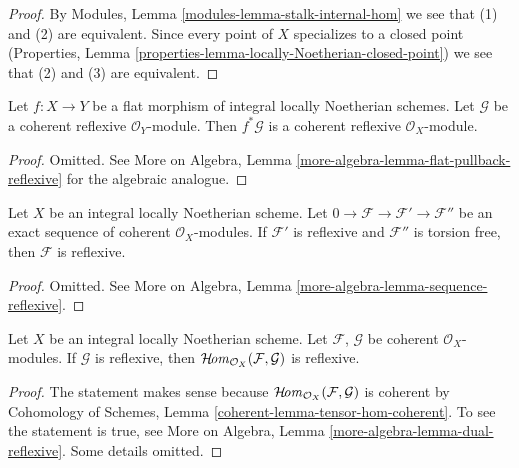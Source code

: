 \begin{proof}
By Modules, Lemma \ref{modules-lemma-stalk-internal-hom} we see that
(1) and (2) are equivalent. Since every point of $X$ specializes to
a closed point
(Properties, Lemma \ref{properties-lemma-locally-Noetherian-closed-point})
we see that (2) and (3) are equivalent.
\end{proof}

\begin{lemma}
\label{lemma-flat-pullback-reflexive}
Let $f : X \to Y$ be a flat morphism of integral locally Noetherian schemes.
Let $\mathcal{G}$ be a coherent reflexive $\mathcal{O}_Y$-module.
Then $f^*\mathcal{G}$ is a coherent reflexive $\mathcal{O}_X$-module.
\end{lemma}

\begin{proof}
Omitted. See
More on Algebra, Lemma \ref{more-algebra-lemma-flat-pullback-reflexive}
for the algebraic analogue.
\end{proof}

\begin{lemma}
\label{lemma-sequence-reflexive}
Let $X$ be an integral locally Noetherian scheme.
Let $0 \to \mathcal{F} \to \mathcal{F}' \to \mathcal{F}''$ be
an exact sequence of coherent $\mathcal{O}_X$-modules.
If $\mathcal{F}'$ is reflexive and $\mathcal{F}''$ is torsion free,
then $\mathcal{F}$ is reflexive.
\end{lemma}

\begin{proof}
Omitted. See More on Algebra, Lemma \ref{more-algebra-lemma-sequence-reflexive}.
\end{proof}

\begin{lemma}
\label{lemma-dual-reflexive}
Let $X$ be an integral locally Noetherian scheme.
Let $\mathcal{F}$, $\mathcal{G}$ be
coherent $\mathcal{O}_X$-modules.
If $\mathcal{G}$ is reflexive,
then $\mathop{\mathcal{H}\!\mathit{om}}\nolimits_{\mathcal{O}_X}(\mathcal{F}, \mathcal{G})$ is reflexive.
\end{lemma}

\begin{proof}
The statement makes sense because
$\mathop{\mathcal{H}\!\mathit{om}}\nolimits_{\mathcal{O}_X}(\mathcal{F}, \mathcal{G})$
is coherent by Cohomology of Schemes, Lemma
\ref{coherent-lemma-tensor-hom-coherent}.
To see the statement is true, see
More on Algebra, Lemma \ref{more-algebra-lemma-dual-reflexive}.
Some details omitted.
\end{proof}


